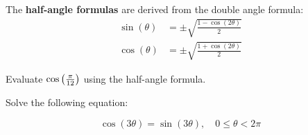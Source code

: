 \documentclass[../mathNotesPreamble]{subfiles}
\begin{document}
    \begin{defn*}
      The \textbf{half-angle formulas} are derived from the double angle formula:
      \begin{align*}
        \sin(\theta)&=\pm\sqrt{\frac{1-\cos(2\theta)}{2}}\\
        \cos(\theta)&=\pm\sqrt{\frac{1+\cos(2\theta)}{2}}
      \end{align*}
    \end{defn*}
    \begin{ex*}
      Evaluate $\cos{\left(\frac{\pi}{12}\right)}$ using the half-angle formula.
    \end{ex*}
    
    \begin{ex*}
      Solve the following equation:
    \end{ex*}
      \[\cos(3\theta)=\sin(3\theta),\quad 0\leq\theta< 2\pi\]
    \pagebreak
\end{document}
